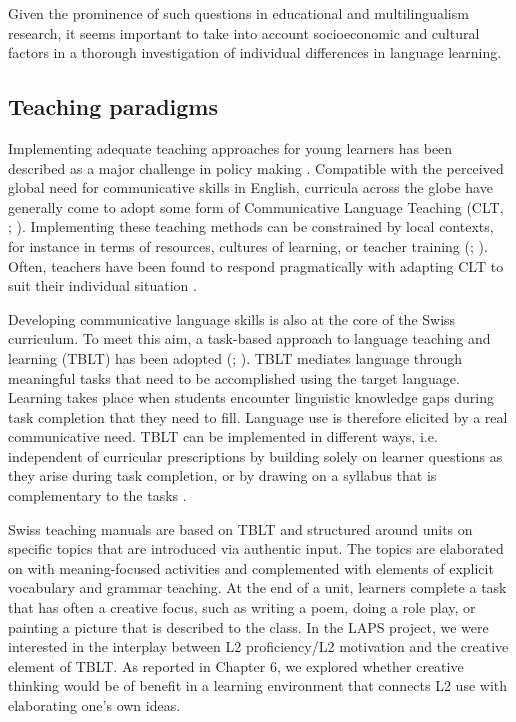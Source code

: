 \documentclass[output=paper]{langscibook}
\begin{document}
Given the prominence of such questions in educational and multilingualism research, it seems important to take into account socioeconomic and cultural factors in a thorough investigation of individual differences in language learning.

\subsection{Teaching paradigms} %

Implementing adequate teaching approaches for young learners has been described as a major challenge in policy making \citep{GartonEtAl2011}. Compatible with the perceived global need for communicative skills in English, curricula across the globe have generally come to adopt some form of Communicative Language Teaching (CLT, \citealt{Krashen1981}; \citealt{GartonEtAl2011}). Implementing these teaching methods can be constrained by local contexts, for instance in terms of resources, cultures of learning, or teacher training (\citealt{Littlewood2006}; \citealt{Baker2008}). Often, teachers have been found to respond pragmatically with adapting CLT to suit their individual situation \citep{Carless2003}.

Developing communicative language skills is also at the core of the Swiss curriculum. To meet this aim, a task-based approach to language teaching and learning (TBLT) has been adopted (\citealt{Willis1996}; \citealt{Ellis2017}). TBLT mediates language through meaningful tasks that need to be accomplished using the target language. Learning takes place when students encounter linguistic knowledge gaps during task completion that they need to fill. Language use is therefore elicited by a real communicative need. TBLT can be implemented in different ways, i.e. independent of curricular prescriptions by building solely on learner questions as they arise during task completion, or by drawing on a syllabus that is complementary to the tasks \citep{Ellis2017}. 

Swiss teaching manuals are based on TBLT and structured around units on specific topics that are introduced via authentic input. The topics are elaborated on with meaning-focused activities and complemented with elements of explicit vocabulary and grammar teaching. At the end of a unit, learners complete a task that has often a creative focus, such as writing a poem, doing a role play, or painting a picture that is described to the class. In the LAPS project, we were interested in the interplay between L2 proficiency/L2 motivation and the creative element of TBLT. As reported in Chapter 6, we explored whether creative thinking would be of benefit in a learning environment that connects L2 use with elaborating one’s own ideas.
\end{document}
